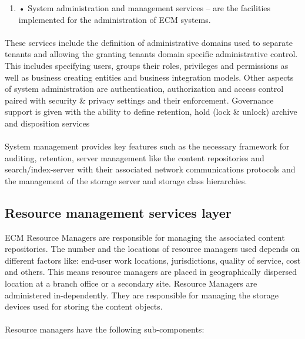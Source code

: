 \documentclass[EPiC]{easychair} %
\begin{document}
\begin{enumerate}
    \item •	System administration and management services – are the facilities implemented for the administration of ECM systems.

\end{enumerate}

\paragraph{} These services include the definition of administrative domains used to separate tenants and allowing the granting tenants domain specific administrative control. This includes specifying users, groups their roles, privileges and permissions as well as business creating entities and business integration models. Other aspects of system administration are authentication, authorization and access control paired with security \& privacy settings and their enforcement. Governance support is given with the ability to define retention, hold (lock \& unlock) archive and disposition services

\paragraph{} System management provides key features such as the necessary framework for auditing, retention, server management like the content repositories and search/index-server with their associated network communications protocols and the management of the storage server and storage class hierarchies.

\subsection{Resource management services layer }
ECM Resource Managers are responsible for managing the associated content repositories. The number and the locations of resource managers used depends on different factors like: end-user work locations, jurisdictions, quality of service, cost and others. This means resource managers are placed in geographically dispersed location at a branch office or a secondary site. Resource Managers are administered in-dependently. They are responsible for managing the storage devices used for storing the content objects.

\paragraph{} Resource managers have the following sub-components:  
\end{document}
